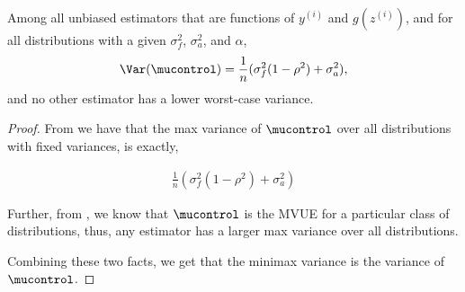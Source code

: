 \begin{thm} [\ref{thm:main}]
Among all unbiased
  estimators that are functions of $y^{(i)}$ and $g(z^{(i)})$, and for all distributions with a given $\sigma^2_f$, $\sigma^2_a$, and $\alpha$,
\begin{align}
  \Var(\mucontrol) = \frac{1}{n} (\sigma^2_f (1 - \rho^2) + \sigma^2_a),
\end{align}
and no other estimator has a lower worst-case variance.
\end{thm}
\begin{proof}
From  we have that the max variance of $\mucontrol$ over all distributions with fixed variances, is exactly,

\begin{align}
\frac{1}{n} (\sigma^2_f (1 - \rho^2) + \sigma^2_a)
\end{align}

Further, from , we know that $\mucontrol$ is the MVUE for a particular class of distributions, thus, any estimator has a larger max variance over all distributions. 

Combining these two facts, we get that the minimax variance is the variance of $\mucontrol$.
\end{proof}
